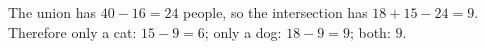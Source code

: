 The union has $ 40-16=24 $ people, so the intersection has $ 18+15-24=9 $. Therefore only a cat: $ 15-9=\boxed6 $; only a dog: $ 18-9=\boxed9 $; both: $\boxed9 $.
